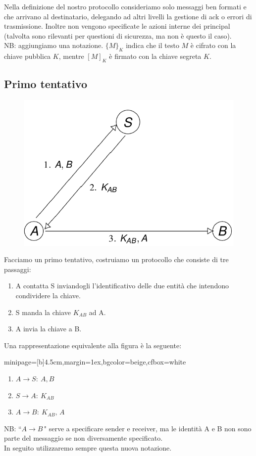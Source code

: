 \documentclass[a4paper, 11pt, twoside, openright, fleqn]{report}
\newcommand{\fromto}[2]{#1\rightarrow #2\!:\ }
\newenvironment{colbox}[2]%
{%
	\par\noindent\hspace{10pt}
	\begin{adjustbox}{minipage=[b]{#2},margin=1ex,bgcolor=#1,cfbox=white}
}{%
	\end{adjustbox}\newline%
}
\begin{document}
Nella definizione del nostro protocollo consideriamo solo messaggi ben formati e che arrivano al destinatario, delegando ad altri livelli la gestione di ack o errori di trasmissione. Inoltre non vengono specificate le azioni interne dei principal (talvolta sono rilevanti per questioni di sicurezza, ma non è questo il caso).\\
NB: aggiungiamo una notazione. $\{M\}_K$ indica che il testo $M$ è cifrato con la chiave pubblica $K$, mentre $[M]_K$ è firmato con la chiave segreta $K$.


\subsection{Primo tentativo}
\begin{figure}[htp]
	\centering
	\includegraphics[width=.5\textwidth]{images/builtproto1}
\end{figure}
\noindent
Facciamo un primo tentativo, costruiamo un protocollo che consiste di tre passaggi:
\begin{enumerate}
	\item A contatta S inviandogli l'identificativo delle due entità che intendono condividere la chiave.
	\item S manda la chiave $K_{AB}$ ad A.
	\item A invia la chiave a B.
\end{enumerate}
Una rappresentazione equivalente alla figura è la seguente:
\begin{colbox}{beige}{4.5cm}
	\begin{enumerate}
		\item $\fromto{A}{S}A, B$
		\item $\fromto{S}{A}K_{AB}$
		\item $\fromto{A}{B}K_{AB},\,A$
	\end{enumerate}
\end{colbox}
NB: ``$A\rightarrow B\,$" serve a specificare sender e receiver, ma le identità A e B non sono parte del messaggio se non diversamente specificato.\\
In seguito utilizzaremo sempre questa nuova notazione.
\end{document}
